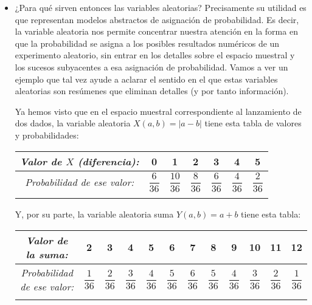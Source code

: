 \begin{itemize}
        \item ¿Para qué sirven entonces las variables aleatorias? Precisamente su utilidad es que representan {\sf modelos abstractos de asignación de probabilidad}. Es decir, la variable aleatoria nos permite concentrar nuestra atención en la forma en que la probabilidad se asigna a los posibles resultados numéricos de un experimento aleatorio, sin entrar en los detalles sobre el espacio muestral y los sucesos subyacentes a esa asignación de probabilidad.  Vamos a ver un ejemplo que tal vez ayude a aclarar el sentido en el que estas variables aleatorias son resúmenes que eliminan detalles (y por tanto información).
            \begin{Ejemplo}\label{ejem:VariablesAleatoriasEliminanInformacion}
            Ya hemos visto que en el espacio muestral correspondiente al lanzamiento de dos dados, la variable aleatoria $X(a,b)=|a-b|$ tiene esta tabla de valores y probabilidades:
            \begin{center}
            \begin{tabular}[t]{|c|c|c|c|c|c|c|}
                \hline
                \rule{0cm}{0.5cm}{\em Valor de $X$ (diferencia):}&0&1&2&3&4&5\\
                \hline
                \rule{0cm}{0.7cm}{\em Probabilidad de ese valor:}&$\dfrac{6}{36}$&$\dfrac{10}{36}$&$\dfrac{8}{36}$&$\dfrac{6}{36}$&$\dfrac{4}{36}$&$\dfrac{2}{36}$\\
                &&&&&&\\
                \hline
            \end{tabular}
            \end{center}
            Y, por su parte, la variable aleatoria suma $Y(a,b)=a+b$ tiene esta tabla:
            \begin{center}
            \begin{tabular}[t]{|c|c|c|c|c|c|c|c|c|c|c|c|}
                \hline
                \rule{0cm}{0.5cm}{\em Valor de la suma:}&2&3&4&5&6&7&8&9&10&11&12\\
                \hline
                \rule{0cm}{0.7cm}{\em Probabilidad de ese valor:}&$\dfrac{1}{36}$&$\dfrac{2}{36}$&$\dfrac{3}{36}$&$\dfrac{4}{36}$&$\dfrac{5}{36}$&$\dfrac{6}{36}$&$\dfrac{5}{36}$&$\dfrac{4}{36}$&$\dfrac{3}{36}$&$\dfrac{2}{36}$&$\dfrac{1}{36}$\\
                &&&&&&&&&&&\\
            \hline
            \end{tabular}
            \end{center}

\end{Ejemplo}
\end{itemize}
